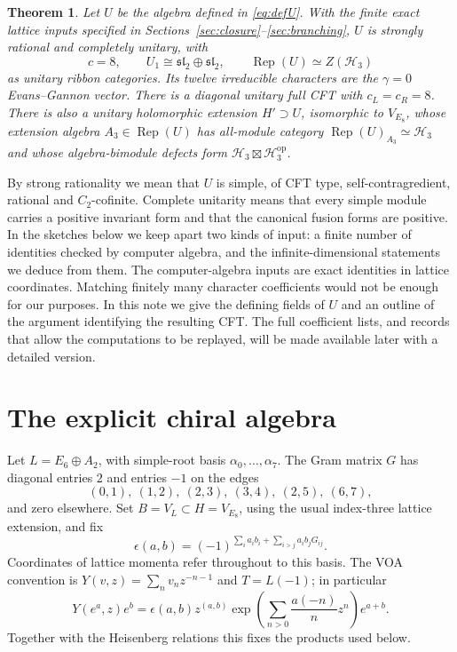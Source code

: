 \documentclass[11pt,a4paper]{article}
\newtheorem{theorem}{Theorem}
\DeclareMathOperator{\Rep}{Rep}
\newcommand{\HH}{\mathcal H}
\begin{document}
\begin{theorem}\label{thm:main}
Let $U$ be the algebra defined in \eqref{eq:defU}. With the finite
exact lattice inputs specified in Sections~\ref{sec:closure}--\ref{sec:branching},
$U$ is strongly rational and completely unitary, with
\begin{equation}\label{eq:main}
 c=8,\qquad U_1\cong\mathfrak{sl}_2\oplus\mathfrak{sl}_2,
 \qquad \Rep(U)\simeq Z(\HH_3)
\end{equation}
as unitary ribbon categories. Its twelve irreducible characters are
the $\gamma=0$ Evans--Gannon vector. There is a diagonal unitary full
CFT with $c_L=c_R=8$. There is also a unitary holomorphic extension
$H'\supset U$, isomorphic to $V_{E_8}$, whose extension algebra
$A_3\in\Rep(U)$ has all-module category $\Rep(U)_{A_3}\simeq\HH_3$
and whose algebra-bimodule defects form
$\HH_3\boxtimes\HH_3^{\mathrm{op}}$.
\end{theorem}

By strong rationality we mean that $U$ is simple, of CFT type,
self-contragredient, rational and $C_2$-cofinite. Complete unitarity
means that every simple module carries a positive invariant form and
that the canonical fusion forms are positive. In the sketches below we
keep apart two kinds of input: a finite number of identities checked
by computer algebra, and the infinite-dimensional statements we deduce
from them. The computer-algebra inputs are exact identities in lattice
coordinates. Matching finitely many character coefficients would not be
enough for our purposes. In this note we give the defining fields of $U$ and an outline of
the argument identifying the resulting CFT. The full coefficient lists, and records that
allow the computations to be replayed, will be made available later
with a detailed version. 

\section{The explicit chiral algebra}\label{sec:definition}
Let $L=E_6\oplus A_2$, with simple-root basis $\alpha_0,\ldots,\alpha_7$.
The Gram matrix $G$ has diagonal entries $2$ and entries $-1$ on the
edges
\[
 (0,1),\ (1,2),\ (2,3),\ (3,4),\ (2,5),\ (6,7),
\]
and zero elsewhere. Set $B=V_L\subset H=V_{E_8}$, using the usual
index-three lattice extension, and fix
\begin{equation}\label{eq:cocycle}
 \epsilon(a,b)=(-1)^{\sum_i a_i b_i+\sum_{i>j}a_i b_jG_{ij}}.
\end{equation}
Coordinates of lattice momenta refer throughout to this basis. The
VOA convention is $Y(v,z)=\sum_n v_nz^{-n-1}$ and $T=L(-1)$; in
particular
\begin{equation}\label{eq:lattice}
 Y(e^a,z)e^b=\epsilon(a,b)z^{(a,b)}
 \exp\!\left(\sum_{n>0}\frac{a(-n)}n z^n\right)e^{a+b}.
\end{equation}
Together with the Heisenberg relations this fixes the products used below.
\end{document}

